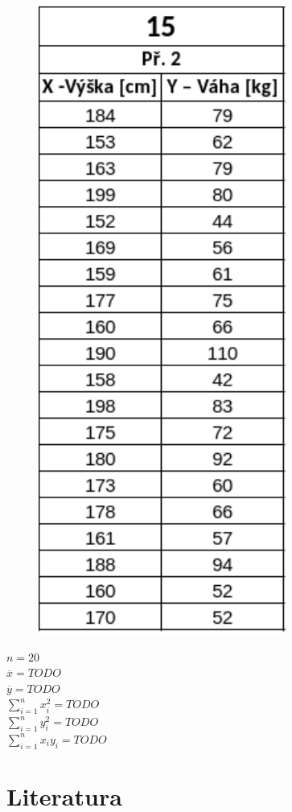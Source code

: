 \documentclass[11pt,a4paper]{article}
\begin{document}
\begin{figure}[H]
    \centering
    \includegraphics[scale=0.85]{img/2table.pdf}
\end{figure}

$ n = 20 $ \\

$ \overline{x} = TODO $ \\

$ \overline{y} = TODO $ \\

$ \sum\limits_{i=1}^{n} x_{i}^2 = TODO $ \\

$ \sum\limits_{i=1}^{n} y_{i}^2 = TODO $ \\

$ \sum\limits_{i=1}^{n} x_i y_i = TODO $ \\

\noindent\makebox[\linewidth]{\rule{\textwidth}{0.4pt}}



\newpage
\section{Literatura}

\begin{flushleft}
    
\end{flushleft}
\end{document}
